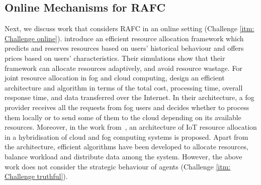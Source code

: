 \documentclass[11pt]{phdthesis}
\begin{document}
\subsection{Online Mechanisms for RAFC}

Next, we discuss work that considers RAFC in an online setting (Challenge \ref{itm: Challenge online}). \citet{aazam2015fog} introduce an efficient resource allocation framework which predicts and reserves resources based on users' historical behaviour and offers prices based on users' characteristics. Their simulations show that their framework can allocate resources adaptively, and avoid resource wastage. For joint resource allocation in fog and cloud computing, \citet{agarwal2016efficient} design an efficient architecture and algorithm in terms of the total cost, processing time, overall response time, and data transferred over the Internet. In their architecture, a fog provider receives all the requests from fog users and decides whether to process them locally or to send some of them to the cloud depending on its available resources. Moreover, in the work from~\citet{alsaffar2016architecture}, an architecture of IoT resource allocation in a hybridisation of cloud and fog computing systems is proposed. Apart from the architecture, efficient algorithms have been developed to allocate resources, balance workload and distribute data among the system. However, the above work does not consider the strategic behaviour of agents (Challenge \ref{itm: Challenge truthful}). 
\end{document}
